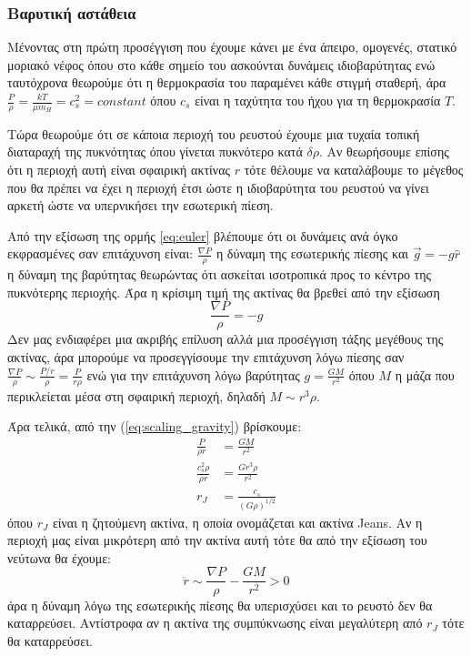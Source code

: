 \documentclass[a4paper,12pt]{memoir}
\begin{document}
\subsubsection{Βαρυτική αστάθεια}
Μένοντας στη πρώτη προσέγγιση που έχουμε κάνει με ένα άπειρο, ομογενές, στατικό μοριακό νέφος όπου στο κάθε σημείο του ασκούνται δυνάμεις ιδιοβαρύτητας ενώ ταυτόχρονα θεωρούμε ότι η θερμοκρασία του παραμένει κάθε στιγμή σταθερή, άρα $\frac{P}{\rho}=\frac{kT}{\mu m_{H}}=c_s^2=constant$ όπου $c_s$ είναι η ταχύτητα του ήχου για τη θερμοκρασία $T$.

Τώρα θεωρούμε ότι σε κάποια περιοχή του ρευστού έχουμε μια τυχαία τοπική διαταραχή της πυκνότητας όπου γίνεται πυκνότερο κατά $\delta \rho$. Αν θεωρήσουμε επίσης ότι η περιοχή αυτή είναι σφαιρική ακτίνας $r$ τότε θέλουμε να καταλάβουμε το μέγεθος που θα πρέπει να έχει η περιοχή έτσι ώστε η ιδιοβαρύτητα του ρευστού να γίνει αρκετή ώστε να υπερνικήσει την εσωτερική πίεση.

Από την εξίσωση της ορμής \ref{eq:euler} βλέπουμε ότι οι δυνάμεις ανά όγκο εκφρασμένες σαν επιτάχυνση είναι: $\frac{\nabla P}{\rho}$ η δύναμη της εσωτερικής πίεσης και $\vec{g}=-g \hat{r}$ η δύναμη της βαρύτητας θεωρώντας ότι ασκείται ισοτροπικά προς το κέντρο της πυκνότερης περιοχής.
Άρα η κρίσιμη τιμή της ακτίνας θα βρεθεί από την εξίσωση
\begin{equation} 
\label{eq:scaling_gravity}
\frac{\nabla P}{\rho} =-g
\end{equation}
Δεν μας ενδιαφέρει μια ακριβής επίλυση αλλά μια προσέγγιση τάξης μεγέθους της ακτίνας, άρα μπορούμε να προσεγγίσουμε την επιτάχυνση λόγω πίεσης σαν $\frac{\nabla P}{\rho} \sim \frac{P/r}{\rho}=\frac{P}{r \rho}$ ενώ για την επιτάχυνση λόγω βαρύτητας $g=\frac{GM}{r^2}$ όπου $M$ η μάζα που περικλείεται μέσα στη σφαιρική περιοχή, δηλαδή $M \sim r^3 \rho$.

Άρα τελικά, από την (\ref{eq:scaling_gravity}) βρίσκουμε:
\begin{align}
\frac{P}{\rho r} &= \frac{GM}{r^2} \\
\frac{c_s ^2 \rho}{\rho r} &= \frac{Gr^3 \rho}{r^2} \\
r_J&=\frac{c_s}{(G \rho)^{1/2}}
\end{align}
όπου $r_{J}$ είναι η ζητούμενη ακτίνα, η οποία ονομάζεται και ακτίνα Jeans. Αν η περιοχή μας είναι μικρότερη από την ακτίνα αυτή τότε θα από την εξίσωση του νεύτωνα θα έχουμε: 
\begin{equation}
\label{eq:newton}
\ddot{r} \sim \frac{\nabla P}{\rho} -\frac{GM}{r^2} > 0
\end{equation}
άρα η δύναμη λόγω της εσωτερικής πίεσης θα υπερισχύσει και το ρευστό δεν θα καταρρεύσει. Αντίστροφα αν η ακτίνα της συμπύκνωσης είναι μεγαλύτερη από $r_J$ τότε θα καταρρεύσει.
\end{document}
